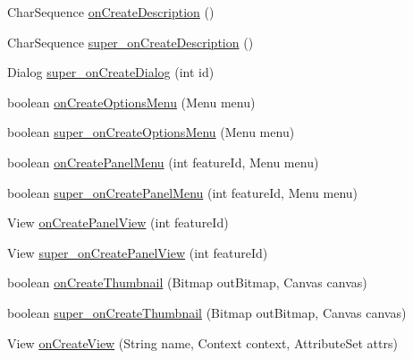 \begin{DoxyCompactItemize}
\item 
Char\+Sequence \hyperlink{classorg_1_1qtproject_1_1qt5_1_1android_1_1bindings_1_1_qt_activity_af86865337837c2c780913132b7118d69}{on\+Create\+Description} ()
\item 
Char\+Sequence \hyperlink{classorg_1_1qtproject_1_1qt5_1_1android_1_1bindings_1_1_qt_activity_a213a5e7065a1b53244d8b3642a23b2e4}{super\+\_\+on\+Create\+Description} ()
\item 
Dialog \hyperlink{classorg_1_1qtproject_1_1qt5_1_1android_1_1bindings_1_1_qt_activity_a946099e0315e24f0c40338b69e0d1cdf}{super\+\_\+on\+Create\+Dialog} (int id)
\item 
boolean \hyperlink{classorg_1_1qtproject_1_1qt5_1_1android_1_1bindings_1_1_qt_activity_a9303a2dd16e8deb7cdcf143ae6b480f4}{on\+Create\+Options\+Menu} (Menu menu)
\item 
boolean \hyperlink{classorg_1_1qtproject_1_1qt5_1_1android_1_1bindings_1_1_qt_activity_a25d0cb2383a485b28f53026ebe050dd4}{super\+\_\+on\+Create\+Options\+Menu} (Menu menu)
\item 
boolean \hyperlink{classorg_1_1qtproject_1_1qt5_1_1android_1_1bindings_1_1_qt_activity_a617b7c2c432bc9894d3c0b2490d27b41}{on\+Create\+Panel\+Menu} (int feature\+Id, Menu menu)
\item 
boolean \hyperlink{classorg_1_1qtproject_1_1qt5_1_1android_1_1bindings_1_1_qt_activity_a3d105b186ba9bf7d089699dbd5ca3c45}{super\+\_\+on\+Create\+Panel\+Menu} (int feature\+Id, Menu menu)
\item 
View \hyperlink{classorg_1_1qtproject_1_1qt5_1_1android_1_1bindings_1_1_qt_activity_aefde1977c2ccae37e5f1a927f7e9e9ee}{on\+Create\+Panel\+View} (int feature\+Id)
\item 
View \hyperlink{classorg_1_1qtproject_1_1qt5_1_1android_1_1bindings_1_1_qt_activity_ab37f48e1ce50767f29be1cebd4fc96e0}{super\+\_\+on\+Create\+Panel\+View} (int feature\+Id)
\item 
boolean \hyperlink{classorg_1_1qtproject_1_1qt5_1_1android_1_1bindings_1_1_qt_activity_a961e15fb9b7bcdc7e4310e881656e1d7}{on\+Create\+Thumbnail} (Bitmap out\+Bitmap, Canvas canvas)
\item 
boolean \hyperlink{classorg_1_1qtproject_1_1qt5_1_1android_1_1bindings_1_1_qt_activity_a2af36b766142fa45fa77623e549112ac}{super\+\_\+on\+Create\+Thumbnail} (Bitmap out\+Bitmap, Canvas canvas)
\item 
View \hyperlink{classorg_1_1qtproject_1_1qt5_1_1android_1_1bindings_1_1_qt_activity_a4f26e1f33245742068eb9b79689f69e5}{on\+Create\+View} (String name, Context context, Attribute\+Set attrs)

\end{DoxyCompactItemize}
